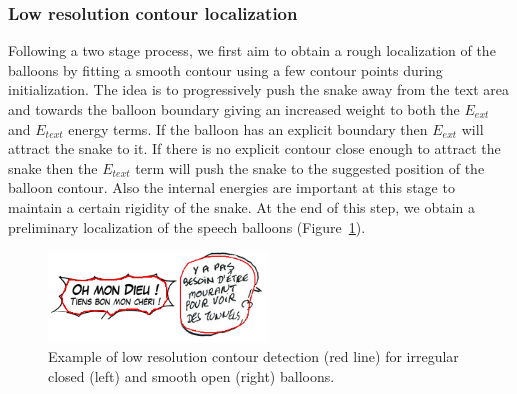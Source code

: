\subsubsection{Low resolution contour localization}
Following a two stage process, we first aim to obtain a rough localization of the balloons by fitting a smooth contour using a few contour points during initialization.
The idea is to progressively push the snake away from the text area and towards the balloon boundary giving an increased weight to both the $E_{ext}$ and $E_{text}$ energy terms.
If the balloon has an explicit boundary then $E_{ext}$ will attract the snake to it.
If there is no explicit contour close enough to attract the snake then the $E_{text}$ term will push the snake to the suggested position of the balloon contour.
Also the internal energies are important at this stage to maintain a certain rigidity of the snake.
At the end of this step, we obtain a preliminary localization of the speech balloons (Figure~\ref{fig:se:mono_res_det}). 

	\begin{figure}[!ht]	%
	  \centering
		\includegraphics[trim = 0mm 3mm 0mm 1mm, clip, width=220px]{mono_res_det.png}
		\caption[Examples of low resolution contour detection for balloon extraction]{Example of low resolution contour detection (red line) for irregular closed (left) and smooth open (right) balloons.}
		\label{fig:se:mono_res_det}
	\end{figure}


